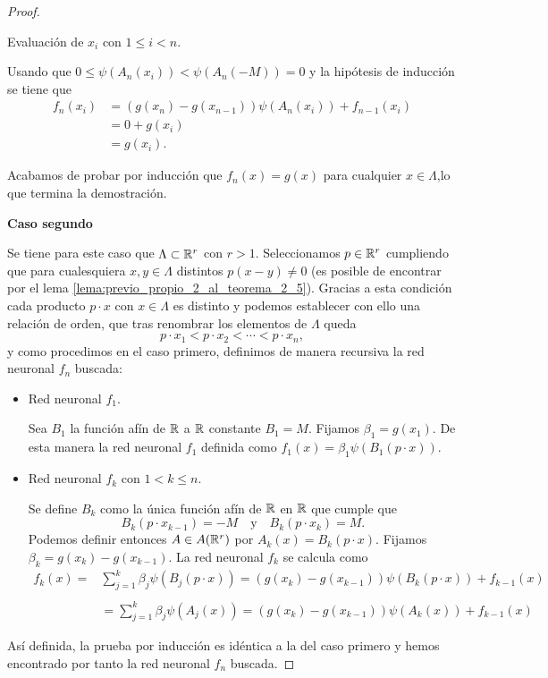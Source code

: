 \begin{proof}
\begin{itemize}
Evaluación de $x_i$ con $1 \leq i < n$. 

Usando que $0 \leq \psi(A_n(x_i)) < \psi(A_n(-M)) = 0$ y la hipótesis de inducción se tiene que 
\begin{align}
    f_n(x_i) 
        &= 
        (g(x_n) - g(x_{n-1}))\psi(A_n(x_i)) + f_{n-1}(x_i)
        \\
        & = 0 + g(x_{i}) 
        \\
        &= g(x_i).
\end{align}
\end{itemize}

Acabamos de probar por inducción  que
$f_n(x) = g(x)$ para cualquier $x \in \Lambda$,lo que termina la demostración.

\textbf{Caso segundo}  

Se tiene para este caso que $\Lambda \subset \mathbb{R}^r$ con $r >1$. 
Seleccionamos $p \in \mathbb{R}^r$ cumpliendo que 
para cualesquiera $x,y \in \Lambda$ distintos 
$p(x-y) \neq 0$ (es posible de 
encontrar por el lema \ref{lema:previo_propio_2_al_teorema_2_5}).
Gracias a esta condición cada producto $p \cdot x$ con $x \in \Lambda$ es distinto y podemos establecer con ello una relación de orden, que tras 
renombrar los elementos de $\Lambda$ queda
\begin{equation}
    p \cdot x_1 < p \cdot x_2 < \cdots < p \cdot x_n,
\end{equation}
y como procedimos en el caso primero, definimos de manera
 recursiva la red neuronal $f_n$ buscada:

 \begin{itemize}
 \item Red neuronal $f_1$. 

Sea $B_1$ 
la función afín de $\mathbb{R}$ a $\mathbb{R}$ constante $B_1 = M.$
Fijamos $\beta_1 = g(x_1)$. 
De esta manera la red neuronal $f_1$ 
definida como $f_1(x) = \beta_1 \psi(B_1(p \cdot x)).$

\item Red neuronal $f_k$ con $1 < k \leq n$. 

Se define $B_{k}$ como la única función afín de $\mathbb{R}$ en $\mathbb{R}$ que cumple que 
\begin{equation}
    B_k(p \cdot x_{k-1}) = -M 
    \quad \text{y} \quad 
     B_{k}(p \cdot x_k)= M.
\end{equation}
Podemos definir entonces $A \in A(\mathbb{R}^r)$ por 
$A_k(x)=B_k(p \cdot x).$
Fijamos $\beta_k = g(x_k) - g(x_{k-1})$. 
La red neuronal $f_k$ se calcula como 
\begin{align}
    f_k(x) 
    = &
    \sum_{j=1}^k \beta_j \psi(B_j(p \cdot x))
     = 
    (g(x_k)-g(x_{k-1})) \psi(B_k(p \cdot x)) + f_{k-1}(x) \\
    \\
    & = 
    \sum_{j=1}^k \beta_j \psi(A_j(x))
    = 
   (g(x_k)-g(x_{k-1})) \psi(A_k(x)) + f_{k-1}(x)  
\end{align}
\end{itemize}

Así definida, la prueba por inducción es idéntica a la del caso primero y hemos encontrado por tanto la red neuronal $f_n$ buscada.
\end{proof}

